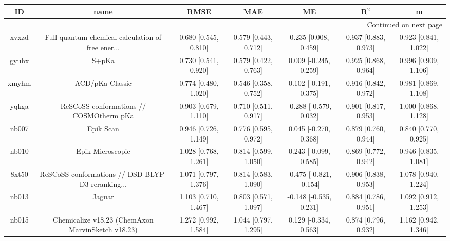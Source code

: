 \documentclass{article}
\begin{document}
\begin{center}
\begin{longtable}{|ccccccc|}
\toprule
    ID &                                               name &                  RMSE &                   MAE &                       ME &                 R$^2$ &                      m \\
\midrule
\endhead
\midrule
\multicolumn{7}{r}{{Continued on next page}} \\
\midrule
\endfoot

\bottomrule
\endlastfoot
 xvxzd &  Full quantum chemical calculation of free ener... &  0.680 [0.545, 0.810] &  0.579 [0.443, 0.712] &     0.235 [0.008, 0.459] &  0.937 [0.883, 0.973] &   0.923 [0.841, 1.022] \\
 gyuhx &                                              S+pKa &  0.730 [0.541, 0.920] &  0.579 [0.422, 0.763] &    0.009 [-0.245, 0.259] &  0.925 [0.868, 0.964] &   0.996 [0.909, 1.106] \\
 xmyhm &                                    ACD/pKa Classic &  0.774 [0.480, 1.020] &  0.546 [0.358, 0.752] &    0.102 [-0.191, 0.375] &  0.916 [0.842, 0.972] &   0.981 [0.869, 1.108] \\
 yqkga &            ReSCoSS conformations // COSMOtherm pKa &  0.903 [0.679, 1.110] &  0.710 [0.511, 0.917] &   -0.288 [-0.579, 0.032] &  0.901 [0.817, 0.953] &   1.000 [0.868, 1.128] \\
 nb007 &                                          Epik Scan &  0.946 [0.726, 1.149] &  0.776 [0.595, 0.972] &    0.045 [-0.270, 0.368] &  0.879 [0.760, 0.944] &   0.840 [0.770, 0.925] \\
 nb010 &                                   Epik Microscopic &  1.028 [0.768, 1.261] &  0.814 [0.599, 1.050] &    0.243 [-0.099, 0.585] &  0.869 [0.772, 0.942] &   0.946 [0.835, 1.081] \\
 8xt50 &  ReSCoSS conformations // DSD-BLYP-D3 reranking... &  1.071 [0.797, 1.376] &  0.814 [0.583, 1.090] &  -0.475 [-0.821, -0.154] &  0.906 [0.838, 0.953] &   1.078 [0.940, 1.224] \\
 nb013 &                                             Jaguar &  1.103 [0.710, 1.467] &  0.803 [0.571, 1.097] &   -0.148 [-0.535, 0.231] &  0.884 [0.786, 0.951] &   1.092 [0.912, 1.253] \\
 nb015 &  Chemicalize v18.23 (ChemAxon MarvinSketch v18.23) &  1.272 [0.992, 1.584] &  1.044 [0.797, 1.295] &    0.129 [-0.334, 0.563] &  0.874 [0.796, 0.932] &   1.162 [0.942, 1.346] \\

\end{longtable}
\end{center}
\end{document}
